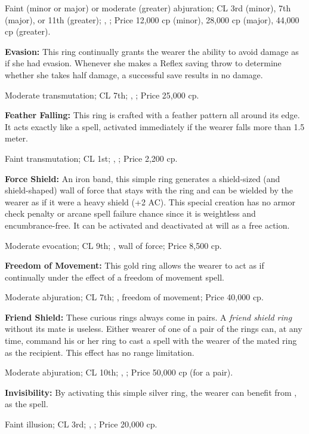 Faint (minor or major) or moderate (greater) abjuration; CL 3rd (minor), 7th (major), or 11th (greater); , ; Price 12,000 cp (minor), 28,000 cp (major), 44,000 cp (greater).

\textbf{Evasion:} This ring continually grants the wearer the ability to avoid damage as if she had evasion. Whenever she makes a Reflex saving throw to determine whether she takes half damage, a successful save results in no damage.

Moderate transmutation; CL 7th; , ; Price 25,000 cp.

\textbf{Feather Falling:} This ring is crafted with a feather pattern all around its edge. It acts exactly like a  spell, activated immediately if the wearer falls more than 1.5 meter.

Faint transmutation; CL 1st; , ; Price 2,200 cp.

\textbf{Force Shield:} An iron band, this simple ring generates a shield-sized (and shield-shaped) wall of force that stays with the ring and can be wielded by the wearer as if it were a heavy shield (+2 AC). This special creation has no armor check penalty or arcane spell failure chance since it is weightless and encumbrance-free. It can be activated and deactivated at will as a free action.

Moderate evocation; CL 9th; , wall of force; Price 8,500 cp.

\textbf{Freedom of Movement:} This gold ring allows the wearer to act as if continually under the effect of a freedom of movement spell.

Moderate abjuration; CL 7th; , freedom of movement; Price 40,000 cp.

\textbf{Friend Shield:} These curious rings always come in pairs. A \emph{friend shield ring} without its mate is useless. Either wearer of one of a pair of the rings can, at any time, command his or her ring to cast a  spell with the wearer of the mated ring as the recipient. This effect has no range limitation.

Moderate abjuration; CL 10th; , ; Price 50,000 cp (for a pair).

\textbf{Invisibility:} By activating this simple silver ring, the wearer can benefit from , as the spell.

Faint illusion; CL 3rd; , ; Price 20,000 cp.


